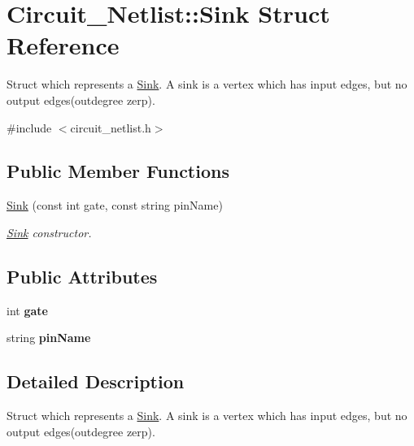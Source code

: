 \hypertarget{structCircuit__Netlist_1_1Sink}{\section{Circuit\-\_\-\-Netlist\-:\-:Sink Struct Reference}
\label{structCircuit__Netlist_1_1Sink}
}


Struct which represents a \hyperlink{structCircuit__Netlist_1_1Sink}{Sink}. A sink is a vertex which has input edges, but no output edges(outdegree zerp).  




{\ttfamily \#include $<$circuit\-\_\-netlist.\-h$>$}

\subsection*{Public Member Functions}
\begin{DoxyCompactItemize}
\item 
\hyperlink{structCircuit__Netlist_1_1Sink_ad56d7d6a65455ec3e328d4bb8876936f}{Sink} (const int gate, const string pin\-Name)
\begin{DoxyCompactList}\small\item\em \hyperlink{structCircuit__Netlist_1_1Sink}{Sink} constructor. \end{DoxyCompactList}\end{DoxyCompactItemize}
\subsection*{Public Attributes}
\begin{DoxyCompactItemize}
\item 
\hypertarget{structCircuit__Netlist_1_1Sink_a5728898bf1ef8a37b46f0f6274676889}{int {\bfseries gate}}\label{structCircuit__Netlist_1_1Sink_a5728898bf1ef8a37b46f0f6274676889}

\item 
\hypertarget{structCircuit__Netlist_1_1Sink_ac2072a83f3d654b10f6ad0b2049cc2e6}{string {\bfseries pin\-Name}}\label{structCircuit__Netlist_1_1Sink_ac2072a83f3d654b10f6ad0b2049cc2e6}

\end{DoxyCompactItemize}


\subsection{Detailed Description}
Struct which represents a \hyperlink{structCircuit__Netlist_1_1Sink}{Sink}. A sink is a vertex which has input edges, but no output edges(outdegree zerp). 




